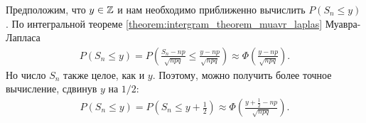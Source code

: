 \documentclass[../main.tex]{subfiles}
\begin{document}
\begin{remrk}
 Предположим, что $ y \in \mathbb{Z} $ и нам необходимо приближенно вычислить $ P(S_n \leqslant y) $. По интегральной теореме \ref{theorem:intergram_theorem_muavr_laplas} Муавра-Лапласа
 \begin{align*}
  P(S_n \leqslant y) = P\left(\frac{S_n - np}{\sqrt{npq}} \leqslant \frac{y - np}{\sqrt{npq}}\right) \approx \Phi \left( \frac{y-np}{\sqrt{npq}} \right)
 .\end{align*} Но число $S_n$ также целое, как и $ y $. Поэтому, можно получить более точное вычисление, сдвинув $ y $ на $ 1 / 2 $:
 \begin{align*}
  P(S_n \leqslant y) = P\left(S_n \leqslant y + \frac{1}{2}\right) \approx \Phi \left( \frac{y + \frac{1}{2} - np}{\sqrt{npq}} \right).
 \end{align*}
\end{remrk}
\end{document}
